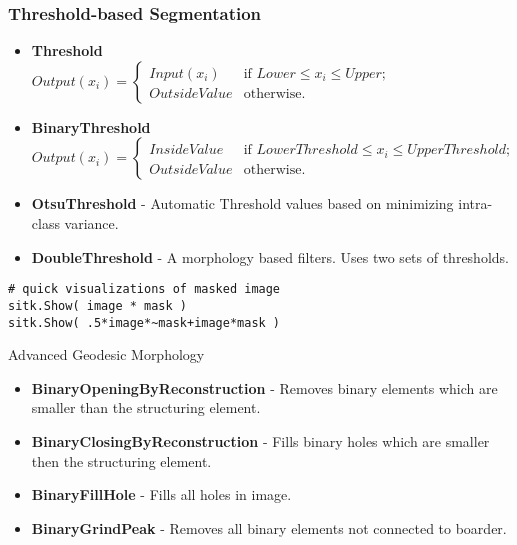 \begin{frame}[fragile]
\frametitle{Threshold-based Segmentation}

\begin{itemize}
  \item {\bf Threshold}\\
    \small
    $ Output(x_i) =
    \begin{cases} Input(x_i) &\text{if $Lower \leq x_i \leq Upper$;}  \\
      OutsideValue            &\text{otherwise.}
    \end{cases} $
    \normalsize
  \item {\bf BinaryThreshold}\\
    \small
    $ Output(x_i) =
    \begin{cases} InsideValue &\text{if $LowerThreshold \leq x_i \leq UpperThreshold$;}  \\
      OutsideValue            &\text{otherwise.}
    \end{cases} $
    \normalsize
  \item {\bf OtsuThreshold} - Automatic Threshold values based on minimizing intra-class variance.
  \item {\bf DoubleThreshold} - A morphology based filters. Uses two sets of thresholds.
\end{itemize}

\lstpython
\begin{lstlisting}
# quick visualizations of masked image
sitk.Show( image * mask )
sitk.Show( .5*image*~mask+image*mask )
\end{lstlisting}

\end{frame}


\begin{frame}{Advanced Geodesic Morphology}

\begin{itemize}
  \item {\bf BinaryOpeningByReconstruction} - Removes binary elements which are smaller than the structuring element.
  \item {\bf BinaryClosingByReconstruction} - Fills binary holes which are smaller then the structuring element.
  \item {\bf BinaryFillHole} - Fills all holes in image.
  \item {\bf BinaryGrindPeak} - Removes all binary elements not connected to boarder.
\end{itemize}


\end{frame}

